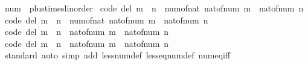 \begin{isabellebody}
%
\endisadelimdocument
{}\isamarkupfalse%
\ num\ {\isacharcolon}{\kern0pt}{\isacharcolon}{\kern0pt}\ {\isachardoublequoteopen}{\isacharbraceleft}{\kern0pt}plus{\isacharcomma}{\kern0pt}times{\isacharcomma}{\kern0pt}linorder{\isacharbraceright}{\kern0pt}{\isachardoublequoteclose}\isanewline
{}\isanewline
\isanewline
{}\isamarkupfalse%
\ {\isacharbrackleft}{\kern0pt}code\ del{\isacharbrackright}{\kern0pt}{\isacharcolon}{\kern0pt}\ {\isachardoublequoteopen}m\ {\isacharplus}{\kern0pt}\ n\ {\isacharequal}{\kern0pt}\ num{\isacharunderscore}{\kern0pt}of{\isacharunderscore}{\kern0pt}nat\ {\isacharparenleft}{\kern0pt}nat{\isacharunderscore}{\kern0pt}of{\isacharunderscore}{\kern0pt}num\ m\ {\isacharplus}{\kern0pt}\ nat{\isacharunderscore}{\kern0pt}of{\isacharunderscore}{\kern0pt}num\ n{\isacharparenright}{\kern0pt}{\isachardoublequoteclose}\isanewline
\isanewline
{}\isamarkupfalse%
\ {\isacharbrackleft}{\kern0pt}code\ del{\isacharbrackright}{\kern0pt}{\isacharcolon}{\kern0pt}\ {\isachardoublequoteopen}m\ {\isacharasterisk}{\kern0pt}\ n\ {\isacharequal}{\kern0pt}\ num{\isacharunderscore}{\kern0pt}of{\isacharunderscore}{\kern0pt}nat\ {\isacharparenleft}{\kern0pt}nat{\isacharunderscore}{\kern0pt}of{\isacharunderscore}{\kern0pt}num\ m\ {\isacharasterisk}{\kern0pt}\ nat{\isacharunderscore}{\kern0pt}of{\isacharunderscore}{\kern0pt}num\ n{\isacharparenright}{\kern0pt}{\isachardoublequoteclose}\isanewline
\isanewline
{}\isamarkupfalse%
\ {\isacharbrackleft}{\kern0pt}code\ del{\isacharbrackright}{\kern0pt}{\isacharcolon}{\kern0pt}\ {\isachardoublequoteopen}m\ {\isasymle}\ n\ {\isasymlongleftrightarrow}\ nat{\isacharunderscore}{\kern0pt}of{\isacharunderscore}{\kern0pt}num\ m\ {\isasymle}\ nat{\isacharunderscore}{\kern0pt}of{\isacharunderscore}{\kern0pt}num\ n{\isachardoublequoteclose}\isanewline
\isanewline
{}\isamarkupfalse%
\ {\isacharbrackleft}{\kern0pt}code\ del{\isacharbrackright}{\kern0pt}{\isacharcolon}{\kern0pt}\ {\isachardoublequoteopen}m\ {\isacharless}{\kern0pt}\ n\ {\isasymlongleftrightarrow}\ nat{\isacharunderscore}{\kern0pt}of{\isacharunderscore}{\kern0pt}num\ m\ {\isacharless}{\kern0pt}\ nat{\isacharunderscore}{\kern0pt}of{\isacharunderscore}{\kern0pt}num\ n{\isachardoublequoteclose}\isanewline
\isanewline
{}\isamarkupfalse%
\isanewline
%
\isadelimproof
\ \ %
\endisadelimproof
%
\isatagproof
{}\isamarkupfalse%
\ standard\ {\isacharparenleft}{\kern0pt}auto\ simp\ add{\isacharcolon}{\kern0pt}\ less{\isacharunderscore}{\kern0pt}num{\isacharunderscore}{\kern0pt}def\ less{\isacharunderscore}{\kern0pt}eq{\isacharunderscore}{\kern0pt}num{\isacharunderscore}{\kern0pt}def\ num{\isacharunderscore}{\kern0pt}eq{\isacharunderscore}{\kern0pt}iff{\isacharparenright}{\kern0pt}%

\end{isabellebody}
